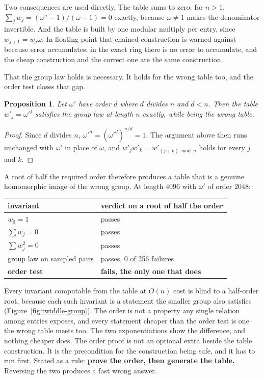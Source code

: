 \documentclass{article}
\newtheorem{proposition}{Proposition}
\begin{document}
Two consequences are used directly. The table sums to zero: for \(n > 1\), \(\sum_j w_j = (\omega^n - 1)/(\omega - 1) = 0\) exactly, because \(\omega \ne 1\) makes the denominator invertible. And the table is built by one modular multiply per entry, since \(w_{j+1} = w_j \omega\). In floating point that chained construction is warned against because error accumulates; in the exact ring there is no error to accumulate, and the cheap construction and the correct one are the same construction.

That the group law holds is necessary. It holds for the wrong table too, and the order test closes that gap.

\begin{proposition}
Let \(\omega'\) have order \(d\) where \(d\) divides \(n\) and \(d < n\). Then the table \(w'_j = \omega'^j\) satisfies the group law at length \(n\) exactly, while being the wrong table.
\end{proposition}

\begin{proof}
Since \(d\) divides \(n\), \(\omega'^n = (\omega'^d)^{n/d} = 1\). The argument above then runs unchanged with \(\omega'\) in place of \(\omega\), and \(w'_j w'_k = w'_{(j+k) \bmod n}\) holds for every \(j\) and \(k\).
\end{proof}

A root of half the required order therefore produces a table that is a genuine homomorphic image of the wrong group. At length \(4096\) with \(\omega'\) of order \(2048\):

\begin{center}
\begin{tabular}{@{}ll@{}}
\toprule
invariant & verdict on a root of half the order \\
\midrule
\(w_0 = 1\) & passes \\
\(\sum w_j = 0\) & passes \\
\(\sum w_j^2 = 0\) & passes \\
group law on sampled pairs & passes, 0 of 256 failures \\
\textbf{order test} & \textbf{fails, the only one that does} \\
\bottomrule
\end{tabular}
\end{center}

Every invariant computable from the table at \(O(n)\) cost is blind to a half-order root, because each such invariant is a statement the smaller group also satisfies (Figure~\ref{fig:twiddle-group}). The order is not a property any single relation among entries exposes, and every statement cheaper than the order test is one the wrong table meets too. The two exponentiations show the difference, and nothing cheaper does. The order proof is not an optional extra beside the table construction. It is the precondition for the construction being safe, and it has to run first. Stated as a rule: \textbf{prove the order, then generate the table.} Reversing the two produces a fast wrong answer.
\end{document}
